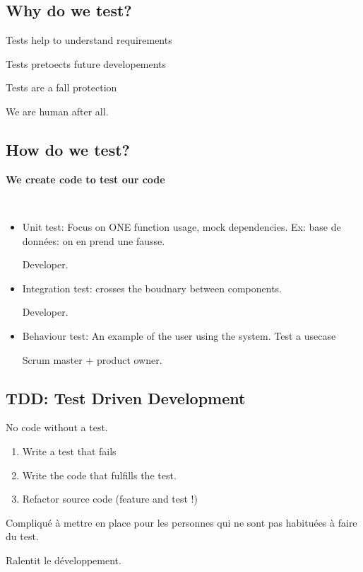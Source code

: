 \documentclass[a4paper,11pt]{article}
\begin{document}
\subsection{Why do we test?}

Tests help to understand requirements

Tests pretoects future developements

Tests are a fall protection

We are human after all.

\subsection{How do we test?}

\textbf{We create code to test our code}

\

\begin{itemize}

\item Unit test: Focus on ONE function usage, mock dependencies. Ex: base de
  données: on en prend une fausse.

  Developer.

\item Integration test: crosses the boudnary between components.

  Developer.

\item Behaviour test: An example of the user using the system. Test a usecase

  Scrum master + product owner.

\end{itemize}

\subsection{TDD: Test Driven Development}

No code without a test.

\begin{enumerate}
\item Write a test that fails
\item Write the code that fulfills the test.
\item Refactor source code (feature and test !)
\end{enumerate}

Compliqué à mettre en place pour les personnes qui ne sont pas habituées à faire
du test.

Ralentit le développement.
\end{document}
